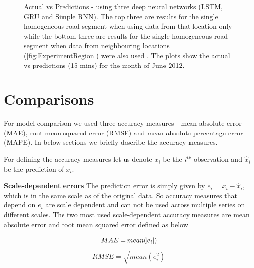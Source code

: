 \begin{figure}[h]

    \caption[Actual vs Predictions, using deep networks]{Actual vs Predictions - using three deep
    neural networks (LSTM, GRU and Simple RNN). The top three are results for the single homogeneous
    road segment when using data from that location only while the bottom three are results for the
    single homogeneous road segment when data from neighbouring locations (\ref{fig:ExperimentRegion})
    were also used . The plots show the actual vs predictions (15 mins) for the month of June 2012.}
    \label{fig:deepNNModels}
\end{figure}

\section{Comparisons}
For model comparison we used three accuracy measures - mean absolute error (MAE), root mean squared
error (RMSE) and mean absolute percentage error (MAPE). In below sections we briefly describe
the accuracy measures.

For defining the accuracy measures let us denote $x_{i}$ be the $i^{th}$ observation and
$\hat{x}_{i}$ be the prediction of $x_{i}$.

\textbf{Scale-dependent errors}
The prediction error is simply given by $e_{i} = x_{i} - \hat{x}_{i}$, which is in the same scale
as of the original data. So accuracy measures that depend on $e_{i}$ are scale dependent and can
not be used across multiple series on different scales. The two most used scale-dependent
accuracy measures are mean absolute error and root mean squared error defined as below

    \begin{equation}
        MAE = mean(\abs{e_{i}})
    \end{equation}
    \begin{equation}
        RMSE = \sqrt{mean(e^{2}_{i})}
    \end{equation}

